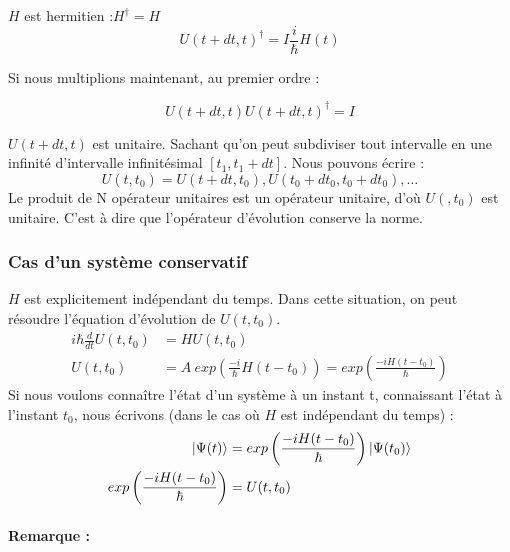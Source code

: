 \documentclass[12pt,a4paper,titlepage]{book}
\begin{document}
$H$ est hermitien :$H^\dagger = H$
\begin{equation*}
U(t+dt, t)^\dagger = I \frac{i}{\hbar} H(t)
\end{equation*}

Si nous multiplions maintenant, au premier ordre :

\begin{equation*}
U(t+dt, t)U(t+dt, t)^\dagger = I
\end{equation*}

$U(t+dt,t)$ est unitaire. Sachant qu'on peut subdiviser tout intervalle en une infinité d'intervalle infinitésimal $[t_1, t_1 +dt]$. Nous pouvons écrire :
\begin{equation*}
U(t, t_0) = U(t+dt, t_0), U(t_0+dt_0, t_0+dt_0), \ldots
\end{equation*}
Le produit de N opérateur unitaires est un opérateur unitaire, d'où $U(, t_0)$ est unitaire. C'est à dire que l'opérateur d'évolution conserve la norme.

\subsubsection{Cas d'un système conservatif}
$H$ est explicitement indépendant du temps. Dans cette situation, on peut résoudre l'équation d'évolution de $U(t, t_0)$.
\begin{align*}
i\hbar \frac{d}{dt} U(t,t_0) &= HU(t, t_0)\\
U(t, t_0) &= A ~exp \left( \frac{-i}{\hbar} H(t-t_0) \right) = exp \left( \frac{-i H (t-t_0)}{\hbar} \right)
\end{align*}
Si nous voulons connaître l'état d'un système à un instant t, connaissant l'état à l'instant $t_0$, nous écrivons (dans le cas où $H$ est indépendant du temps) :
\begin{align*}
\ket{\Psi (t)} &= exp \left( \frac{-i H (t-t_0)}{\hbar} \right) \ket{\Psi (t_0)}\\
exp \left( \frac{-i H (t-t_0)}{\hbar} \right) &= U (t, t_0)
\end{align*}

\paragraph*{Remarque :}
\end{document}
